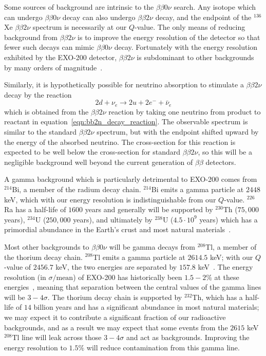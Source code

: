Some sources of background are intrinsic to the $\beta\beta 0\nu$ search.  Any isotope which can undergo $\beta\beta 0\nu$ decay can also undergo $\beta\beta 2\nu$ decay, and the endpoint of the $^{136}$Xe $\beta\beta 2\nu$ spectrum is necessarily at our $Q$-value.  The only means of reducing background from $\beta\beta 2\nu$ is to improve the energy resolution of the detector so that fewer such decays can mimic $\beta\beta 0\nu$ decay.  Fortunately with the energy resolution exhibited by the EXO-200 detector, $\beta\beta 2\nu$ is subdominant to other backgrounds by many orders of magnitude~\cite{NewEXObb0nPaper_2014}.

Similarly, it is hypothetically possible for neutrino absorption to stimulate a $\beta\beta 2\nu$ decay by the reaction
\begin{equation}
2d + \nu_e \rightarrow 2u + 2e^- + \bar{\nu}_e
\end{equation}
which is obtained from the $\beta\beta 2\nu$ reaction by taking one neutrino from product to reactant in equation~\ref{eqn:bb2n_decay_reaction}.  The observable spectrum is similar to the standard $\beta\beta 2\nu$ spectrum, but with the endpoint shifted upward by the energy of the absorbed neutrino.  The cross-section for this reaction is expected to be well below the cross-section for standard $\beta\beta 2\nu$, so this will be a negligible background well beyond the current generation of $\beta\beta$ detectors.

A gamma background which is particularly detrimental to EXO-200 comes from $^{214}$Bi, a member of the radium decay chain.  $^{214}$Bi emits a gamma particle at $2448$ keV, which with our energy resolution is indistinguishable from our $Q$-value.   $^{226}$Ra has a half-life of $1600$ years and generally will be supported by $^{230}$Th ($75,000$ years), $^{234}$U ($250,000$ years), and ultimately by $^{238}$U ($4.5 \cdot 10^9$ years) which has a primordial abundance in the Earth's crust and most natural materials~\cite{ENSDF}.

Most other backgrounds to $\beta\beta 0\nu$ will be gamma decays from $^{208}$Tl, a member of the thorium decay chain.  $^{208}$Tl emits a gamma particle at $2614.5$ keV; with our $Q$-value of $2456.7$ keV, the two energies are separated by $157.8$ keV~\cite{ENSDF}.  The energy resolution (in $\sigma/\text{mean}$) of EXO-200 has historically been $1.5-2\%$ at these energies~\cite{NewEXObb0nPaper_2014}, meaning that separation between the central values of the gamma lines will be $3-4\sigma$.  The thorium decay chain is supported by $^{232}$Th, which has a half-life of $14$ billion years and has a significant abundance in most natural materials; we may expect it to contribute a significant fraction of our radioactive backgrounds, and as a result we may expect that some events from the $2615$ keV $^{208}$Tl line will leak across those $3-4\sigma$ and act as backgrounds.  Improving the energy resolution to $1.5\%$ will reduce contamination from this gamma line.

